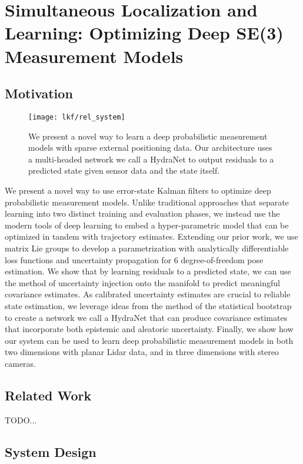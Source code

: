 \chapter{Simultaneous Localization and Learning: Optimizing Deep SE(3) Measurement Models}

\section{Motivation}

\begin{figure}
	\centering
	\texttt{[image: lkf/rel\_system]}
	\caption{We present a novel way to learn a deep probabilistic measurement models with sparse external positioning data. Our architecture uses a multi-headed network we call a HydraNet to output residuals to a predicted state given sensor data and the state itself.}
	\label{fig:lkf_system}
\end{figure}

We present a novel way to use error-state Kalman filters to optimize deep probabilistic measurement models. Unlike traditional approaches that separate learning into two distinct training and evaluation phases, we instead use the modern tools of deep learning to embed a hyper-parametric model that can be optimized in tandem with trajectory estimates. Extending our prior work, we use matrix Lie groups to develop a parametrization with analytically differentiable loss functions and uncertainty propagation for 6 degree-of-freedom pose estimation. We show that by learning residuals to a predicted state, we can use the method of uncertainty injection onto the manifold to predict meaningful covariance estimates. As calibrated uncertainty estimates are crucial to reliable state estimation, we leverage ideas from the method of the statistical bootstrap to create a network we call a HydraNet that can produce covariance estimates that incorporate both epistemic and aleatoric uncertainty. Finally, we show how our system can be used to learn deep probabilistic measurement models in both two dimensions with planar Lidar data, and in three dimensions with stereo cameras.

\section{Related Work}

TODO...

\section{System Design}

